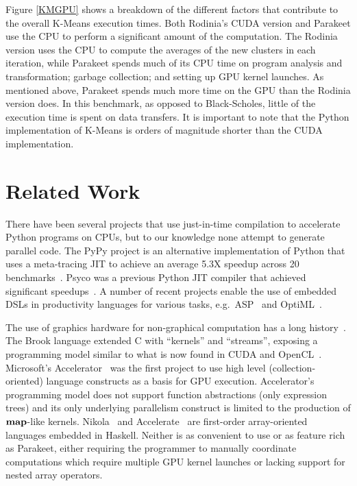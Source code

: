 \documentclass[10pt,twocolumn]{article}
\begin{document}
Figure \ref{KMGPU} shows a breakdown of the different factors that contribute to the overall K-Means execution times.  Both Rodinia's CUDA version and Parakeet use the CPU to perform a significant amount of the computation.  The Rodinia version uses the CPU to compute the averages of the new clusters in each iteration, while Parakeet spends much of its CPU time on program analysis and transformation; garbage collection; and setting up GPU kernel launches.  As mentioned above, Parakeet spends much more time on the GPU than the Rodinia version does. In this benchmark, as opposed to Black-Scholes, little of the execution time is spent on data transfers.  It is important to note that the Python implementation of K-Means is orders of magnitude shorter than the CUDA implementation.

\section{Related Work}
\label{RelatedWork}
There have been several projects that use just-in-time compilation to accelerate Python programs on CPUs, but to our knowledge none attempt to generate parallel code.  The PyPy project is an alternative implementation of Python that uses a meta-tracing JIT to achieve an average 5.3X speedup across 20 benchmarks~\cite{Rigo06}. Psyco was a previous Python JIT compiler that achieved significant speedups~\cite{Rigo04}.  A number of recent projects enable the use of embedded DSLs in productivity languages for various tasks, e.g.~ASP~\cite{Cook11} and OptiML~\cite{Chaf11}.

The use of graphics hardware for non-graphical computation has a long history~\cite{Leng90}. The Brook language extended C with ``kernels'' and ``streams'', exposing a programming model similar to what is now found in CUDA and OpenCL~\cite{Buck04}.  Microsoft's Accelerator~\cite{Tard06} was the first project to use high level (collection-oriented) language constructs as a basis for GPU execution. Accelerator's programming model does not support function abstractions (only expression trees) and its only underlying parallelism construct is limited to the production of $\mbox{\textbf{map}}$-like kernels.  Nikola~\cite{Main10} and Accelerate~\cite{Chak11} are first-order array-oriented languages embedded in Haskell. Neither is as convenient to use or as feature rich as Parakeet, either requiring the programmer to manually coordinate computations which require multiple GPU kernel launches or lacking support for nested array operators.
\end{document}
